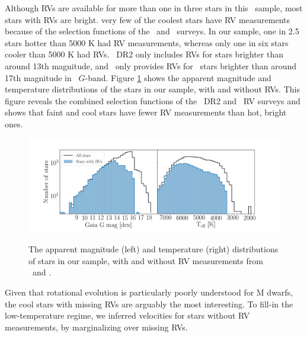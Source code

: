 Although RVs are available for more than one in three stars in this \kepler\
sample, most stars with RVs are bright.
very few of the coolest stars have RV measurements because of the
selection functions of the \gaia\ and \lamost\ surveys.
In our sample, one in 2.5 stars hotter than 5000 K had RV measurements,
whereas only one in six stars cooler than 5000 K had RVs.
\gaia\ DR2 only includes RVs for stars brighter than around 13th magnitude,
and \lamost\ only provides RVs for \kepler\ stars brighter than around 17th
magnitude in \gaia\ $G$-band.
Figure \ref{fig:rv_histogram} shows the apparent magnitude and temperature
distributions of the stars in our sample, with and without RVs.
This figure reveals the combined selection functions of the \gaia\ DR2 and
\lamost\ RV surveys and shows that faint and cool stars have fewer RV
measurements than hot, bright ones.
\begin{figure}[ht!]
\caption{
    The apparent magnitude (left) and temperature (right) distributions of
    stars in our sample, with and without RV measurements from \gaia\ and
    \lamost.
}
  \centering \includegraphics[width=1\textwidth]{rv_histogram}
\label{fig:rv_histogram}
\end{figure}
Given that rotational evolution is particularly poorly understood for M
dwarfs, the cool stars with missing RVs are arguably the most interesting.
To fill-in the low-temperature regime, we inferred velocities for stars
without RV measurements, by marginalizing over missing RVs.
